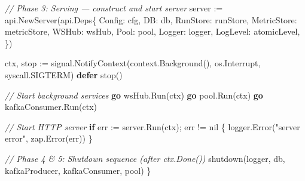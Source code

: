 \documentclass[
]{article}
\newenvironment{Shaded}{}{}
\newcommand{\CommentTok}[1]{\textcolor[rgb]{0.38,0.63,0.69}{\textit{#1}}}
\newcommand{\ControlFlowTok}[1]{\textcolor[rgb]{0.00,0.44,0.13}{\textbf{#1}}}
\newcommand{\NormalTok}[1]{#1}
\newcommand{\OperatorTok}[1]{\textcolor[rgb]{0.40,0.40,0.40}{#1}}
\newcommand{\OtherTok}[1]{\textcolor[rgb]{0.00,0.44,0.13}{#1}}
\newcommand{\StringTok}[1]{\textcolor[rgb]{0.25,0.44,0.63}{#1}}
\begin{document}
\begin{Shaded}
\begin{Highlighting}[]
    \CommentTok{// Phase 3: Serving — construct and start server}
\NormalTok{    server }\OperatorTok{:=}\NormalTok{ api}\OperatorTok{.}\NormalTok{NewServer}\OperatorTok{(}\NormalTok{api}\OperatorTok{.}\NormalTok{Deps}\OperatorTok{\{}
\NormalTok{        Config}\OperatorTok{:}\NormalTok{      cfg}\OperatorTok{,}
\NormalTok{        DB}\OperatorTok{:}\NormalTok{          db}\OperatorTok{,}
\NormalTok{        RunStore}\OperatorTok{:}\NormalTok{    runStore}\OperatorTok{,}
\NormalTok{        MetricStore}\OperatorTok{:}\NormalTok{ metricStore}\OperatorTok{,}
\NormalTok{        WSHub}\OperatorTok{:}\NormalTok{       wsHub}\OperatorTok{,}
\NormalTok{        Pool}\OperatorTok{:}\NormalTok{        pool}\OperatorTok{,}
\NormalTok{        Logger}\OperatorTok{:}\NormalTok{      logger}\OperatorTok{,}
\NormalTok{        LogLevel}\OperatorTok{:}\NormalTok{    atomicLevel}\OperatorTok{,}
    \OperatorTok{\})}

\NormalTok{    ctx}\OperatorTok{,}\NormalTok{ stop }\OperatorTok{:=}\NormalTok{ signal}\OperatorTok{.}\NormalTok{NotifyContext}\OperatorTok{(}\NormalTok{context}\OperatorTok{.}\NormalTok{Background}\OperatorTok{(),}\NormalTok{ os}\OperatorTok{.}\NormalTok{Interrupt}\OperatorTok{,}\NormalTok{ syscall}\OperatorTok{.}\NormalTok{SIGTERM}\OperatorTok{)}
    \ControlFlowTok{defer}\NormalTok{ stop}\OperatorTok{()}

    \CommentTok{// Start background services}
    \ControlFlowTok{go}\NormalTok{ wsHub}\OperatorTok{.}\NormalTok{Run}\OperatorTok{(}\NormalTok{ctx}\OperatorTok{)}
    \ControlFlowTok{go}\NormalTok{ pool}\OperatorTok{.}\NormalTok{Run}\OperatorTok{(}\NormalTok{ctx}\OperatorTok{)}
    \ControlFlowTok{go}\NormalTok{ kafkaConsumer}\OperatorTok{.}\NormalTok{Run}\OperatorTok{(}\NormalTok{ctx}\OperatorTok{)}

    \CommentTok{// Start HTTP server}
    \ControlFlowTok{if}\NormalTok{ err }\OperatorTok{:=}\NormalTok{ server}\OperatorTok{.}\NormalTok{Run}\OperatorTok{(}\NormalTok{ctx}\OperatorTok{);}\NormalTok{ err }\OperatorTok{!=} \OtherTok{nil} \OperatorTok{\{}
\NormalTok{        logger}\OperatorTok{.}\NormalTok{Error}\OperatorTok{(}\StringTok{"server error"}\OperatorTok{,}\NormalTok{ zap}\OperatorTok{.}\NormalTok{Error}\OperatorTok{(}\NormalTok{err}\OperatorTok{))}
    \OperatorTok{\}}

    \CommentTok{// Phase 4 \& 5: Shutdown sequence (after ctx.Done())}
\NormalTok{    shutdown}\OperatorTok{(}\NormalTok{logger}\OperatorTok{,}\NormalTok{ db}\OperatorTok{,}\NormalTok{ kafkaProducer}\OperatorTok{,}\NormalTok{ kafkaConsumer}\OperatorTok{,}\NormalTok{ pool}\OperatorTok{)}
\OperatorTok{\}}
\end{Highlighting}
\end{Shaded}
\end{document}
